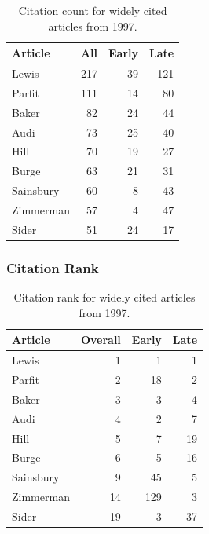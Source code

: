 \documentclass[
  10pt,
  letterpaper,
  DIV=11,
  numbers=noendperiod,
  twoside]{scrartcl}
\begin{document}
\begin{longtable}[]{@{}lrrr@{}}

\caption{\label{tbl-citation-count-1997}Citation count for widely cited
articles from 1997.}

\tabularnewline

\toprule\noalign{}
Article & All & Early & Late \\
\midrule\noalign{}
\endhead
\bottomrule\noalign{}
\endlastfoot
Lewis & 217 & 39 & 121 \\
Parfit & 111 & 14 & 80 \\
Baker & 82 & 24 & 44 \\
Audi & 73 & 25 & 40 \\
Hill & 70 & 19 & 27 \\
Burge & 63 & 21 & 31 \\
Sainsbury & 60 & 8 & 43 \\
Zimmerman & 57 & 4 & 47 \\
Sider & 51 & 24 & 17 \\

\end{longtable}

\subsubsection*{Citation Rank}\label{sec-rank-1997}

\begin{longtable}[]{@{}lrrr@{}}

\caption{\label{tbl-citation-rank-1997}Citation rank for widely cited
articles from 1997.}

\tabularnewline

\toprule\noalign{}
Article & Overall & Early & Late \\
\midrule\noalign{}
\endhead
\bottomrule\noalign{}
\endlastfoot
Lewis & 1 & 1 & 1 \\
Parfit & 2 & 18 & 2 \\
Baker & 3 & 3 & 4 \\
Audi & 4 & 2 & 7 \\
Hill & 5 & 7 & 19 \\
Burge & 6 & 5 & 16 \\
Sainsbury & 9 & 45 & 5 \\
Zimmerman & 14 & 129 & 3 \\
Sider & 19 & 3 & 37 \\

\end{longtable}
\end{document}
